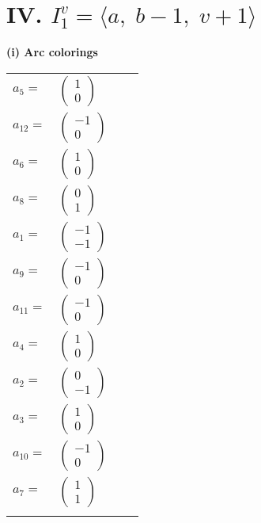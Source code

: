 \documentclass[1p]{elsarticle_modified}
\theoremstyle{definition}
\begin{document}
\centering \section*{IV. $I^v_{1}= \langle a,\;b-1,\;v+1 \rangle$}
\flushleft \textbf{(i) Arc colorings}\\
\begin{tabular}{m{7pt} m{180pt} m{7pt} m{180pt} }
\flushright $a_{5}=$&$\begin{pmatrix}1\\0\end{pmatrix}$ \\
\flushright $a_{12}=$&$\begin{pmatrix}-1\\0\end{pmatrix}$ \\
\flushright $a_{6}=$&$\begin{pmatrix}1\\0\end{pmatrix}$ \\
\flushright $a_{8}=$&$\begin{pmatrix}0\\1\end{pmatrix}$ \\
\flushright $a_{1}=$&$\begin{pmatrix}-1\\-1\end{pmatrix}$ \\
\flushright $a_{9}=$&$\begin{pmatrix}-1\\0\end{pmatrix}$ \\
\flushright $a_{11}=$&$\begin{pmatrix}-1\\0\end{pmatrix}$ \\
\flushright $a_{4}=$&$\begin{pmatrix}1\\0\end{pmatrix}$ \\
\flushright $a_{2}=$&$\begin{pmatrix}0\\-1\end{pmatrix}$ \\
\flushright $a_{3}=$&$\begin{pmatrix}1\\0\end{pmatrix}$ \\
\flushright $a_{10}=$&$\begin{pmatrix}-1\\0\end{pmatrix}$ \\
\flushright $a_{7}=$&$\begin{pmatrix}1\\1\end{pmatrix}$\\&\end{tabular}
\end{document}
